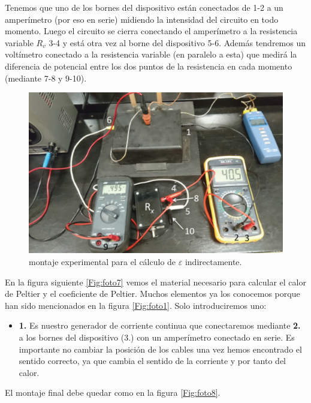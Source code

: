 \documentclass[12pt,a4paper]{article}
\begin{document}
\newpage

Tenemos que uno de los bornes del dispositivo están conectados de 1-2 a un amperímetro (por eso en serie) midiendo la intensidad del circuito en todo momento. Luego el circuito se cierra conectando el amperímetro a la resistencia variable $R_v$ 3-4 y está otra vez al borne del dispositivo 5-6. Además tendremos un voltímetro conectado a la resistencia variable (en paralelo a esta) que medirá la diferencia de potencial entre los dos puntos de la resistencia en cada momento (mediante 7-8 y 9-10). 

\begin{figure}[h!] \centering
\includegraphics[scale=0.6]{foto6.png}
\caption{montaje experimental para el cálculo de $\varepsilon$ indirectamente.}
\label{Fig:foto6}
\end{figure} 

En la figura siguiente \ref{Fig:foto7} vemos el material necesario para calcular el calor de Peltier y el coeficiente de Peltier. Muchos elementos ya los conocemos porque han sido mencionados en la figura \ref{Fig:foto1}. Solo introduciremos uno:

\begin{itemize}
\item \textbf{1.} Es nuestro generador de corriente continua que conectaremos mediante \textbf{2.} a los bornes  del dispositivo (3.) con un amperímetro conectado en serie. Es importante no cambiar la posición de los cables una vez hemos encontrado el sentido correcto, ya que cambia el sentido de la corriente y por tanto del calor.
\end{itemize}

El montaje final debe quedar como en la figura \ref{Fig:foto8}. 
\end{document}
